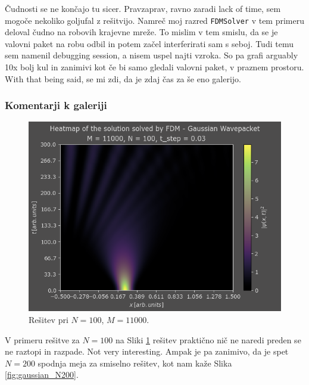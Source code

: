 \documentclass[a4paper]{article}
\begin{document}
Čudnosti se ne končajo tu sicer. Pravzaprav, ravno zaradi lack of time, sem mogoče nekoliko goljufal
z rešitvijo. Namreč moj razred \texttt{FDMSolver} v tem primeru deloval čudno na robovih krajevne mreže.
To mislim v tem smislu, da se je valovni paket na robu odbil in potem začel interferirati sam s seboj.
Tudi temu sem namenil debugging session, a nisem uspel najti vzroka. So pa grafi arguably 10x bolj
kul in zanimivi kot če bi samo gledali valovni paket, v praznem prostoru. With that being said,
se mi zdi, da je zdaj čas za še eno galerijo.\\

\subsubsection{Komentarji k galeriji}

\begin{figure}[p]
    \centering
    \includegraphics[width=\textwidth]{./images/case2_N100.png}
    \caption{Rešitev pri $N=100$, $M=11000$.}
    \label{fig:gaussian_N100}
\end{figure}

V primeru rešitve za $N=100$ na Sliki \ref{fig:gaussian_N100} rešitev praktično nič ne naredi 
preden se ne raztopi in razpade. Not very interesting. Ampak je pa zanimivo, da je spet $N=200$
spodnja meja za smiselno rešitev, kot nam kaže Slika \ref{fig:gaussian_N200}.
\end{document}
